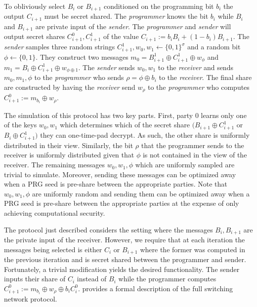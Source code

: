 To obliviously select $B_i$ or $B_{i+1}$ conditioned on the programming bit $b_i$ the output $C_{i+1}$ must be secret shared. The \emph{programmer} knows the bit $b_i$ while $B_i$ and $B_{i+1}$ are private input of the \emph{sender}. The \emph{programmer} and \emph{sender} will output secret shares $C^0_{i+1}, C_{i+1}^1$ of the value $C_{i+1}:=b_i B_i + (1-b_i)B_{i+1}$. The \emph{sender} samples three random strings $C_{i+1}^1, w_0,w_1\gets \{0,1\}^\sigma$ and a random bit $\phi\gets \{0,1\}$. They construct two messages $m_0=B_{i+1}^1\oplus C_{i+1}^1\oplus w_\phi$ and $m_1= B_i\oplus C_{i+1}^1 \oplus w_{\phi\oplus 1}$. The \emph{sender} sends $w_0,w_1$ to the \emph{receiver} and sends $m_0,m_1,\phi$ to the \emph{programmer} who sends $\rho=\phi\oplus b_i$ to the \emph{receiver}. The final share are constructed by having the \emph{receiver} send $w_\rho$ to the \emph{programmer} who computes $C_{i+1}^0:=m_{b_i}\oplus w_{\rho}$.
\iffullversion

The simulation of this protocol has two key parts. First, party 0 learns only one of the keys $w_0,w_1$ which determines which of the secret share $(B_{i+1}\oplus C_{i+1}^1$ or $  B_i\oplus C_{i+1}^1)$ they can one-time-pad decrypt. As such, the other share is uniformly distributed in their view. Similarly, the bit $\rho$ that the programmer sends to the receiver is uniformly distributed given that $\phi$ is not contained in the view of the receiver. The remaining messages $w_0,w_1,\phi$ which are uniformly sampled are trivial to simulate. Moreover, sending these messages can be optimized away when a PRG seed is pre-share between the appropriate parties.
\else
Note that  $w_0,w_1,\phi$  are uniformly random and sending them can be optimized away when a PRG seed is pre-share between the appropriate parties at the expense of only achieving computational security.
\fi

The protocol just described considers the setting where the messages $B_i,B_{i+1}$ are the private input of the receiver. However, we require that at each iteration the messages being selected is either $C_i$ or $B_{i+1}$ where the former was computed in the previous iteration and is secret shared between the programmer and sender. Fortunately, a trivial modification yields the desired functionality. The sender inputs their share of $C_i$ instead of $B_i$ while the programmer computes $C_{i+1}^0:=m_{b_i}\oplus w_{\rho}\oplus b_iC_{i}^0$.   provides a formal description of the full switching network protocol.

